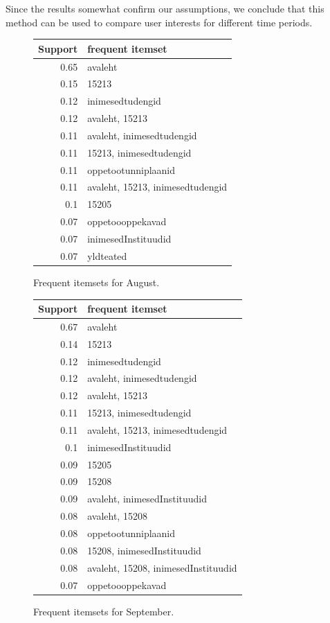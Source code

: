 \documentclass[12pt, english,a4paper]{article}
\begin{document}
Since the results somewhat confirm our assumptions, we conclude that this method can be used to compare user interests for different time periods.


\begin{figure}[H]
  \centering
\begin{tabular}{ r | l }
Support & frequent itemset \\ \hline
0.65 & avaleht \\ \hline
0.15 & 15213 \\ \hline
0.12 & inimesedtudengid \\ \hline
0.12 & avaleht, 15213 \\ \hline
0.11 & avaleht, inimesedtudengid \\ \hline
0.11 & 15213, inimesedtudengid \\ \hline
0.11 & oppetootunniplaanid \\ \hline
0.11 & avaleht, 15213, inimesedtudengid \\ \hline
0.1 & 15205 \\ \hline
0.07 & oppetoooppekavad \\ \hline
0.07 & inimesedInstituudid \\ \hline
0.07 & yldteated \\ \hline
\end{tabular}
  \caption{Frequent itemsets for August.}
  \label{aug2}
\end{figure}



\begin{figure}[H]
  \centering
\begin{tabular}{ r | l }
Support & frequent itemset \\ \hline
0.67 & avaleht \\ \hline
0.14 & 15213 \\ \hline
0.12 & inimesedtudengid \\ \hline
0.12 & avaleht, inimesedtudengid \\ \hline
0.12 & avaleht, 15213 \\ \hline
0.11 & 15213, inimesedtudengid \\ \hline
0.11 & avaleht, 15213, inimesedtudengid \\ \hline
0.1 & inimesedInstituudid \\ \hline
0.09 & 15205 \\ \hline
0.09 & 15208 \\ \hline
0.09 & avaleht, inimesedInstituudid \\ \hline
0.08 & avaleht, 15208 \\ \hline
0.08 & oppetootunniplaanid \\ \hline
0.08 & 15208, inimesedInstituudid \\ \hline
0.08 & avaleht, 15208, inimesedInstituudid \\ \hline
0.07 & oppetoooppekavad \\ \hline
\end{tabular}
  \caption{Frequent itemsets for September.}
  \label{sep2}
\end{figure}
\end{document}
